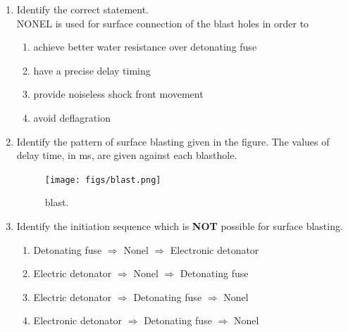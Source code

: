 \documentclass[journal]{IEEEtran}
\begin{document}
\begin{enumerate}
\item Identify the correct statement. \\
NONEL is used for surface connection of the blast holes in order to
  \begin{enumerate}
\item achieve better water resistance over detonating fuse
      \item have a precise delay timing
      \item provide noiseless shock front movement
      \item avoid deflagration
  \end{enumerate}

  \hfill{}

\item Identify the pattern of surface blasting given in the figure. 
The values of delay time, in ms, are given against each blasthole.

\begin{figure}[h!]
    \centering
    \texttt{[image: figs/blast.png]}
    \caption{blast.}
    \label{fig:blast}
\end{figure}

\begin{enumerate}
\end{enumerate}
\hfill{}

\item Identify the initiation sequence which is \textbf{NOT} possible for surface blasting.
  \begin{enumerate}
\item Detonating fuse $\Rightarrow$ Nonel $\Rightarrow$ Electronic detonator
      \item Electric detonator $\Rightarrow$ Nonel $\Rightarrow$ Detonating fuse
      \item Electric detonator $\Rightarrow$ Detonating fuse $\Rightarrow$ Nonel
      \item Electronic detonator $\Rightarrow$ Detonating fuse $\Rightarrow$ Nonel
  \end{enumerate}
  \hfill{}


\end{enumerate}
\end{document}
